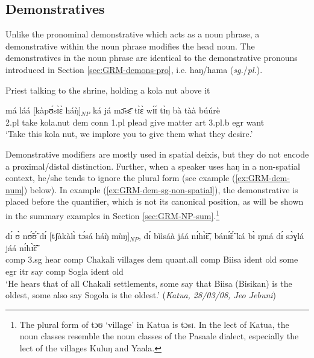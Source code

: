 \begin{exe}
\begin{exe}
\begin{exe}
{\begin{exe}
\begin{exe}
\begin{exe}
\begin{exe}
\begin{exe}
\begin{exe}
\begin{exe}
\begin{exe}
\begin{exe}
 
\subsection{Demonstratives}
\label{sec:GRM-demons}


Unlike the pronominal demonstrative which acts as a noun phrase, 
a demonstrative
within the noun phrase modifies the head noun. The demonstratives in the noun
phrase are identical to the demonstrative pronouns introduced in Section
\ref{sec:GRM-demons-pro}, i.e.  {\sls haŋ}/{\sls hama}  ({\it sg.}/{\it pl.}).  



\begin{exe}
   \ex\label{ex:GRM-dem-sg}{\rm Priest talking to the shrine, holding a kola
nut above it}

\gll  má láá [kàpʊ́sɪ̀ɛ̀ háŋ̀]$_{NP}$ ká já mɔ̄sɛ̄ tɪ̀ɛ̀ wɪ́ɪ́ tɪ̀ŋ bà 
tàà búúrè\\
{\sc 2.pl} take kola.nut {\sc dem} {\sc conn} {\sc 1.pl} plead give matter {\sc
art} {\sc 3.pl.b} {\sc  egr} want\\
\glt   `Take this kola nut, we implore  you to give them what they desire.'

\z

Demonstrative  modifiers are mostly used in spatial deixis, but they do not
encode a proximal/distal distinction. Further, when a speaker uses {\sls haŋ}  
in
a non-spatial context, he/she tends to ignore the plural form (see example
(\ref{ex:GRM-dem-num}) below). In example (\ref{ex:GRM-dem-sg-non-spatial}), the
 demonstrative is placed before the quantifier,  which is not its canonical
position, as will be  shown in the summary examples in Section
\ref{sec:GRM-NP-sum}.\footnote{The plural form of {\sls tɔʊ} `village' in Katua 
is
{\sls tɔsɪ}. In the lect of Katua, the noun classes resemble the noun classes of
the Pasaale dialect, especially the lect of the villages  Kuluŋ and Yaala.} 



\begin{exe}
   \ex\label{ex:GRM-dem-sg-non-spatial}

\gll  dɪ́ ʊ̀ nʊ̃́ʊ̃́  dɪ́ [tʃàkàlɪ̀ tɔ́sá háŋ̀ mùŋ]$_{NP}$, dɪ́ bììsáà 
jáá nɪ́hɪ̃̀ɛ̃̂, bánɪ̃́ɛ̃́ 
ká bɪ̀ ŋmá dɪ́ sɔ̀ɣlá jáá nɪ́hɪ̃̀ɛ̃̂\\
{\sc comp} {\sc 3.sg}  hear {\sc comp} Chakali villages {\sc dem} {\sc quant}.all 
{\sc comp} Biisa {\sc ident} old some {\sc egr} {\sc itr}  say {\sc comp}
Sogla {\sc
ident} old\\
 \glt `He hears that of all  Chakali
settlements, some say that Biisa (Bisikan) is the oldest,  some
also say Sogola is the oldest.' ({\it Katua, 28/03/08, Jeo Jebuni})


\end{exe}
\end{exe}
\end{exe}
\end{exe}
\end{exe}
\end{exe}
\end{exe}
\end{exe}
\end{exe}
\end{exe}
\end{exe}}
\end{exe}
\end{exe}
\end{exe}
